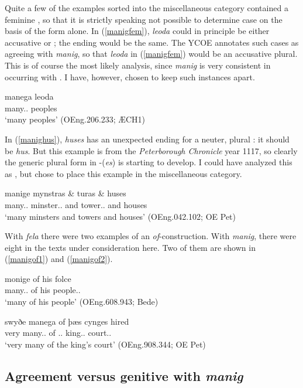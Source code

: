 \documentclass[output=paper,colorlinks,citecolor=brown]{langscibook}
\begin{document}
Quite a few of the examples sorted into the miscellaneous category contained a feminine , so that it is strictly speaking not possible to determine case on the basis of the form alone. In (\ref{manigfem}), \textit{leoda} could in principle be either accusative or ; the ending would be the same. The YCOE  annotates such cases as agreeing with \textit{manig}, so that \textit{leoda} in (\ref{manigfem}) would be an accusative plural. This is of course the most likely analysis, since \textit{manig} is very consistent in occurring with . I have, however, chosen to keep such instances apart.

\ea\label{manigfem}
\gll manega leoda\\
	many.\ACC.\PL{} peoples\\
\glt ‘many peoples’ (OEng.206.233; ÆCH1)
\z

In (\ref{manighus}), \textit{huses} has an unexpected ending for a neuter, plural : it should be \textit{hus}. But this example is from the \textit{Peterborough Chronicle} year 1117, so clearly the generic plural form in -(\textit{es}) is starting to develop. I could have analyzed this as , but chose to place this example in the miscellaneous category.

\ea\label{manighus}
\gll manige mynstras \& turas \& huses\\
	many.\NOM.\PL{} minster.\NOM.\PL{} and tower.\NOM.\PL{} and houses\\
\glt ‘many minsters and towers and houses’ (OEng.042.102; OE Pet)
\z

With \textit{fela} there were two examples of an \textit{of}-construction. With \textit{manig}, there were eight in the texts under consideration here. Two of them are shown in (\ref{manigof1}) and (\ref{manigof2}).

\ea\label{manigof1}
\gll monige of his folce\\
many.\NOM.\PL{} of his people.\DAT.\SG\\
\glt ‘many of his people’ (OEng.608.943; Bede)
\z

\ea\label{manigof2}
\gll swyðe manega of þæs cynges hired\\
very many.\NOM.\PL{} of \DEF.\GEN.\SG{} king.\GEN.\SG{} court.\ACC.\SG\\
\glt ‘very many of the king’s court’ (OEng.908.344; OE Pet)
\z

\subsection{Agreement versus genitive with \textit{manig}}\label{sect:manigagrpart}
\end{document}

